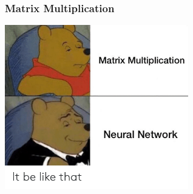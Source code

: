 \begin{frame}
\frametitle{Matrix Multiplication}

\begin{center}
	\includegraphics[width=0.6\textwidth]{images/matrix-mult.png}
\end{center}

\end{frame}


